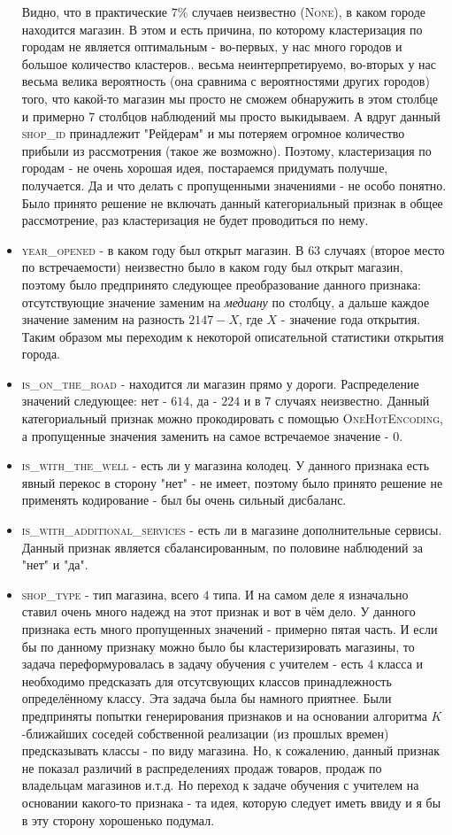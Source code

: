 \documentclass[%
10pt, %
final, %
oneside, %
onecolumn, %
centertags]{article} %
\theoremstyle{plain}
\theoremstyle{definition}
\theoremstyle{remark}
\begin{document}
\begin{itemize}
	Видно, что в практические $7\%$ случаев неизвестно (\textsc{None}), в каком городе находится магазин. В этом и есть причина, по которому кластеризация по городам не является оптимальным - во-первых, у нас много городов и большое количество кластеров.. весьма неинтерпретируемо, во-вторых у нас весьма велика вероятность (она сравнима с вероятностями других городов) того, что какой-то магазин мы просто не сможем обнаружить в этом столбце и примерно 7 столбцов наблюдений мы просто выкидываем. А вдруг данный \textsc{shop\_id} принадлежит "Рейдерам" и мы потеряем огромное количество прибыли из рассмотрения (такое же возможно). Поэтому, кластеризация по городам - не очень хорошая идея, постараемся придумать получше, получается. Да и что делать с пропущенными значениями - не особо понятно. Было принято решение не включать данный категориальный признак в общее рассмотрение, раз кластеризация не будет проводиться по нему.
	\item \textsc{year\_opened} - в каком году был открыт магазин. В $63$ случаях (второе место по встречаемости) неизвестно было в каком году был открыт магазин, поэтому было предпринято следующее преобразование данного признака: отсутствующие значение заменим на \textit{медиану} по столбцу, а дальше каждое значение заменим на разность $2147 - X$, где $X$ - значение года открытия. Таким образом мы переходим к некоторой описательной статистики открытия города.
	\item \textsc{is\_on\_the\_road} - находится ли магазин прямо у дороги. Распределение значений следующее: нет - $614$, да - $224$ и в $7$ случаях неизвестно. Данный категориальный признак можно прокодировать с помощью \textsc{OneHotEncoding}, а пропущенные значения заменить на самое встречаемое значение - $0$.
	\item \textsc{is\_with\_the\_well} - есть ли у магазина колодец. У данного признака есть явный перекос в сторону "нет" - не имеет, поэтому было принято решение не применять кодирование - был бы очень сильный дисбаланс.
	\item \textsc{is\_with\_additional\_services} - есть ли в магазине дополнительные сервисы. Данный признак является сбалансированным, по половине наблюдений за "нет" и "да".
	\item \textsc{shop\_type} - тип магазина, всего $4$ типа. И на самом деле я изначально ставил очень много надежд на этот признак и вот в чём дело. У данного признака есть много пропущенных значений - примерно пятая часть. И если бы по данному признаку можно было бы кластеризировать магазины, то задача переформуровалась в задачу обучения с учителем - есть $4$ класса и необходимо предсказать для отсутсвующих классов принадлежность определённому классу. Эта задача была бы намного приятнее. Были предприняты попытки генерирования признаков и на основании алгоритма $K$-ближайших соседей собственной реализации (из прошлых времен) предсказывать классы - по виду магазина. Но, к сожалению, данный признак не показал различий в распределениях продаж товаров, продаж по владельцам магазинов и.т.д. Но переход к задаче обучения с учителем на основании какого-то признака - та идея, которую следует иметь ввиду и я бы в эту сторону хорошенько подумал.
\end{itemize}
\end{document}
